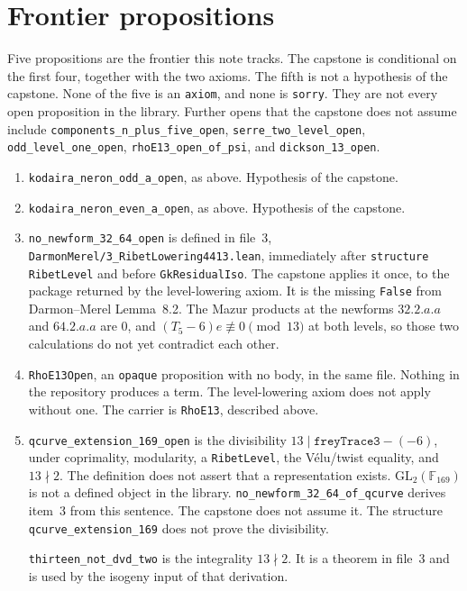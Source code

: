 \documentclass[11pt]{amsart}
\begin{document}
\section{Frontier propositions}
Five propositions are the frontier this note tracks.
The capstone is conditional on the first four, together with the two axioms.
The fifth is not a hypothesis of the capstone.
None of the five is an \texttt{axiom}, and none is \texttt{sorry}.
They are not every open proposition in the library.
Further opens that the capstone does not assume include \texttt{components\_n\_plus\_five\_open}, \texttt{serre\_two\_level\_open}, \texttt{odd\_level\_one\_open}, \texttt{rhoE13\_open\_of\_psi}, and \texttt{dickson\_13\_open}.

\begin{enumerate}
\item \texttt{kodaira\_neron\_odd\_a\_open}, as above. Hypothesis of the capstone.
\item \texttt{kodaira\_neron\_even\_a\_open}, as above. Hypothesis of the capstone.
\item \texttt{no\_newform\_32\_64\_open} is defined in file~3, \texttt{DarmonMerel/3\_RibetLowering4413.lean}, immediately after \texttt{structure RibetLevel} and before \texttt{GkResidualIso}.
The capstone applies it once, to the package returned by the level-lowering axiom.
It is the missing \texttt{False} from Darmon--Merel Lemma~8.2. The Mazur products at the newforms $32.2.a.a$ and $64.2.a.a$ are $0$, and $(T_5-6)e\not\equiv 0\pmod{13}$ at both levels, so those two calculations do not yet contradict each other.
\item \texttt{RhoE13Open}, an \texttt{opaque} proposition with no body, in the same file.
Nothing in the repository produces a term. The level-lowering axiom does not apply without one.
The carrier is \texttt{RhoE13}, described above.
\item \texttt{qcurve\_extension\_169\_open} is the divisibility $13\mid \texttt{freyTrace3}-(-6)$, under coprimality, modularity, a \texttt{RibetLevel}, the V\'elu/twist equality, and $13\nmid 2$.
The definition does not assert that a representation exists.
$\mathrm{GL}_2(\mathbb F_{169})$ is not a defined object in the library.
\texttt{no\_newform\_32\_64\_of\_qcurve} derives item~3 from this sentence.
The capstone does not assume it.
The structure \texttt{qcurve\_extension\_169} does not prove the divisibility.

\texttt{thirteen\_not\_dvd\_two} is the integrality $13\nmid 2$.
It is a theorem in file~3 and is used by the isogeny input of that derivation.
\end{enumerate}
\end{document}
